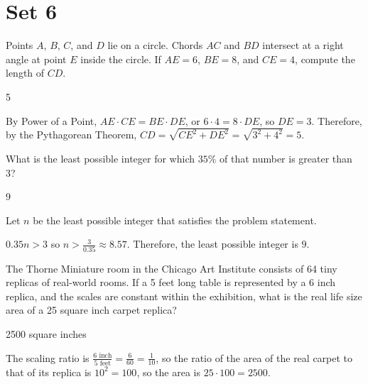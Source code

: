 \documentclass[11pt]{article}
\begin{document}
\newpage

\section*{Set 6}

\begin{problem}
Points $A$, $B$, $C$, and $D$ lie on a circle. Chords $AC$ and $BD$ intersect at a right angle at point $E$ inside the circle. If $AE = 6$, $BE = 8$, and $CE = 4$, compute the length of $CD$.
\end{problem}

\begin{answer}
5
\end{answer}

\begin{solution}
By Power of a Point, $AE \cdot CE = BE \cdot DE$, or $6 \cdot 4 = 8 \cdot DE$, so $DE = 3$. Therefore, by the Pythagorean Theorem, $CD = \sqrt{CE^2 + DE^2} = \sqrt{3^2 + 4^2} = 5$.
\end{solution}


\begin{problem}
What is the least possible integer for which $35\%$ of that number is greater than 3?
\end{problem}

\begin{answer}
9
\end{answer}

\begin{solution}
Let $n$ be the least possible integer that satisfies the problem statement.

$0.35n > 3$ so $n > \frac{3}{0.35} \approx 8.57$. Therefore, the least possible integer is $9$.
\end{solution}


\begin{problem} %
The Thorne Miniature room in the Chicago Art Institute consists of 64 tiny replicas of real-world rooms. If a 5 feet long table is represented by a 6 inch replica, and the scales are constant within the exhibition, what is the real life size area of a 25 square inch carpet replica?
\end{problem}

\begin{answer}
2500 square inches
\end{answer}

\begin{solution}
The scaling ratio is $\frac{6 \text{ inch}}{5 \text{ feet}} = \frac{6}{60} = \frac{1}{10}$, so the ratio of the area of the real carpet to that of its replica is $10^2 = 100$, so the area is $25 \cdot 100 = 2500$.
\end{solution}
\end{document}
